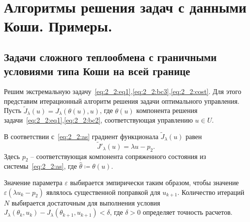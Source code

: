 \section{Алгоритмы решения задач с данными Коши. Примеры.}\label{sec:ch4/sec4}

\subsection{
    Задачи сложного теплообмена
    с граничными условиями типа Коши на всей границе
}\label{subsec:ch4/sec4/subsec1}

Решим экстремальную задачу~\eqref{eq:2_2:eq1},\eqref{eq:2_2:bc3},\eqref{eq:2_2:cost}.
Для этого представим итерационный алгоритм решения задачи оптимального управления.
Пусть $\tilde J_\lambda(u)=J_\lambda(\theta(u), u)$, где $\theta(u)$ компонента решения
задачи~\eqref{eq:2_2:eq1},\eqref{eq:2_2:bc2}, соответствующая управлению $u\in U$.

В соответствии с~\eqref{eq:2_2:as} градиент функционала $\tilde J_\lambda(u)$ равен
\[
    \tilde J'_\lambda (u) = \lambda u - p_2.
\]
Здесь $p_2$ -- соответствующая компонента сопряженного
состояния из системы~\eqref{eq:2_2:as}, где $\hat{\theta}\coloneqq\theta(u)$.


Значение параметра $\varepsilon$ выбирается эмпирически таким образом, чтобы значение
$\varepsilon (\lambda u_k - p_2)$ являлось существенной поправкой для $u_{k+1}$.
Количество итераций $N$ выбирается достаточным для выполнения условия
$J_\lambda(\theta_k, u_k) - J_\lambda(\theta_{k+1}, u_{k+1}) < \delta$, где $\delta>0$
определяет точность расчетов.

